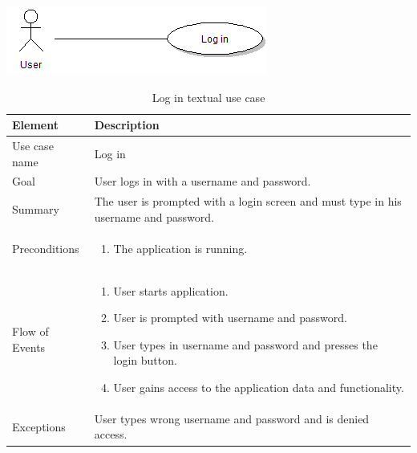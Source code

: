 \begin{table}
\begin{center}
\begin{center}
\includegraphics[width=\textwidth]{login}
\end{center}
\begin{tabular}{p{3cm}|p{12cm}} \hline
\textbf{Element} & \textbf{Description} \\ \hline \hline
Use case name & Log in \\ 
Goal & User logs in with a username and password. \\
Summary &The user is prompted with a login screen and must type in his username and password. \\
Preconditions &
\begin{enumerate}
\item{}The application is running.
\end{enumerate} \\ \hline
Flow of Events &
\begin{enumerate}
\item{}User starts application.
\item{}User is prompted with username and password.
\item{}User types in username and password and presses the login button.
\item{}User gains access to the application data and functionality.
\end{enumerate} \\ \hline
Exceptions & User types wrong username and password and is denied access.\\ \hline
\end{tabular}
\end{center}
\caption{Log in textual use case} \label{tab:login}
\end{table}

